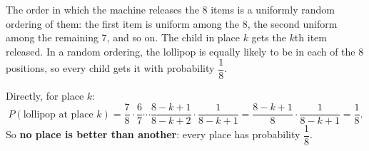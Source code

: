 The order in which the machine releases the $8$ items is a uniformly random ordering of them: the first item is uniform among the $8$, the second uniform among the remaining $7$, and so on. The child in place $k$ gets the $k$th item released. In a random ordering, the lollipop is equally likely to be in each of the $8$ positions, so every child gets it with probability $\dfrac{1}{8}$.

Directly, for place $k$:
\[
P(\text{lollipop at place }k)=\dfrac{7}{8}\cdot\dfrac{6}{7}\cdots\dfrac{8-k+1}{8-k+2}\cdot\dfrac{1}{8-k+1}=\dfrac{8-k+1}{8}\cdot\dfrac{1}{8-k+1}=\dfrac{1}{8} .
\]
So \textbf{no place is better than another}: every place has probability $\boxed{\dfrac{1}{8}}$.
